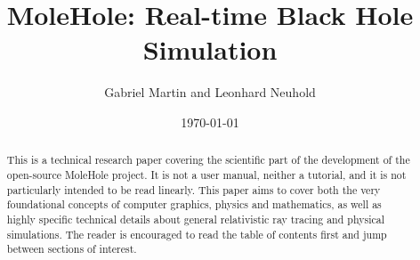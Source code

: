 \documentclass[10pt, a4paper, twocolumn, openany, oneside]{book}
\title{\textbf{MoleHole: Real-time Black Hole Simulation}}
\author{Gabriel Martin and Leonhard Neuhold}
\date{\today}
\begin{document}
\frontmatter
\onecolumn
\maketitle
\thispagestyle{empty}
\begin{abstract}
This is a technical research paper covering the scientific part of the development of the open-source MoleHole project. 
It is not a user manual, neither a tutorial, and it is not particularly intended to be read linearly.
This paper aims to cover both the very foundational concepts of computer graphics, physics and mathematics,
as well as highly specific technical details about general relativistic ray tracing and physical simulations.
The reader is encouraged to read the table of contents first and jump between sections of interest.
\end{abstract}
\newpage

\tableofcontents
\ifdraftmode\listoftodos\fi
\clearpage
\twocolumn

\mainmatter


\backmatter
\printbibliography[heading=bibintoc]
\printglossary[type=\acronymtype, title=Acronyms]
\end{document}

